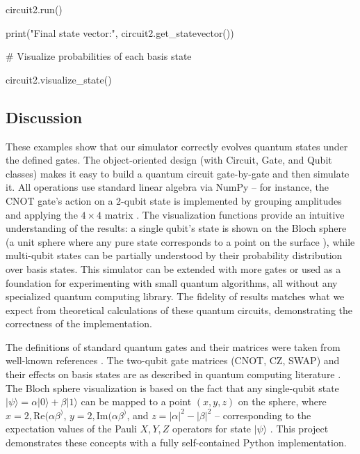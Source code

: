 \documentclass[%
oneside,                 %
final,                   %
10pt]{article}
\begin{document}
circuit2.run()

print("Final state vector:", circuit2.get_statevector())

# Visualize probabilities of each basis state

circuit2.visualize_state()

\epycod


\subsection{Discussion}

These examples show that our simulator correctly evolves quantum
states under the defined gates. The object-oriented design (with
Circuit, Gate, and Qubit classes) makes it easy to build a quantum
circuit gate-by-gate and then simulate it. All operations use standard
linear algebra via NumPy – for instance, the CNOT gate’s action on a
2-qubit state is implemented by grouping amplitudes and applying the
$4\times4$ matrix . The visualization functions provide an intuitive
understanding of the results: a single qubit’s state is shown on the
Bloch sphere (a unit sphere where any pure state corresponds to a
point on the surface ), while multi-qubit states can be partially
understood by their probability distribution over basis states. This
simulator can be extended with more gates or used as a foundation for
experimenting with small quantum algorithms, all without any
specialized quantum computing library. The fidelity of results matches
what we expect from theoretical calculations of these quantum
circuits, demonstrating the correctness of the implementation.

The definitions of standard quantum gates and their matrices were
taken from well-known references . The two-qubit gate matrices (CNOT,
CZ, SWAP) and their effects on basis states are as described in
quantum computing literature . The Bloch sphere visualization is based
on the fact that any single-qubit state
$|\psi\rangle=\alpha|0\rangle+\beta|1\rangle$ can be mapped to a point
$(x,y,z)$ on the sphere, where $x = 2,\mathrm{Re}(\alpha \beta^)$, $y
= 2,\mathrm{Im}(\alpha \beta^)$, and $z = |\alpha|^2 - |\beta|^2$ –
corresponding to the expectation values of the Pauli $X,Y,Z$ operators
for state $|\psi\rangle$ . This project demonstrates these concepts
with a fully self-contained Python implementation.



\end{document}
